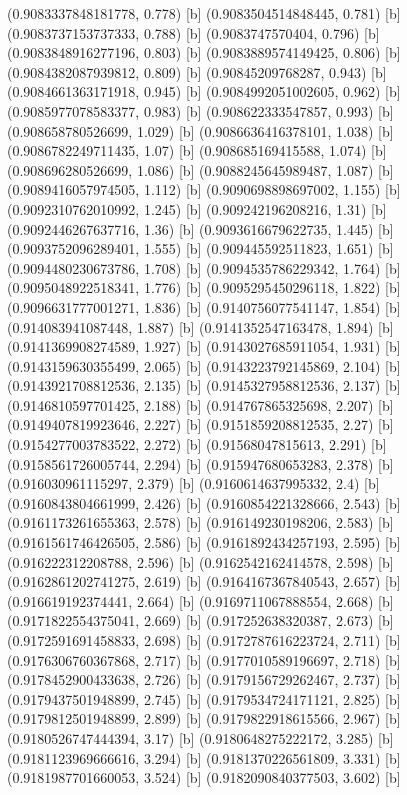 {{{(0.9083337848181778, 0.778) [b] 
(0.9083504514848445, 0.781) [b] 
(0.9083737153737333, 0.788) [b] 
(0.9083747570404, 0.796) [b] 
(0.9083848916277196, 0.803) [b] 
(0.9083889574149425, 0.806) [b] 
(0.9084382087939812, 0.809) [b] 
(0.90845209768287, 0.943) [b] 
(0.9084661363171918, 0.945) [b] 
(0.9084992051002605, 0.962) [b] 
(0.9085977078583377, 0.983) [b] 
(0.908622333547857, 0.993) [b] 
(0.908658780526699, 1.029) [b] 
(0.9086636416378101, 1.038) [b] 
(0.9086782249711435, 1.07) [b] 
(0.908685169415588, 1.074) [b] 
(0.908696280526699, 1.086) [b] 
(0.9088245645989487, 1.087) [b] 
(0.9089416057974505, 1.112) [b] 
(0.9090698898697002, 1.155) [b] 
(0.9092310762010992, 1.245) [b] 
(0.909242196208216, 1.31) [b] 
(0.9092446267637716, 1.36) [b] 
(0.9093616679622735, 1.445) [b] 
(0.9093752096289401, 1.555) [b] 
(0.909445592511823, 1.651) [b] 
(0.9094480230673786, 1.708) [b] 
(0.9094535786229342, 1.764) [b] 
(0.9095048922518341, 1.776) [b] 
(0.9095295450296118, 1.822) [b] 
(0.9096631777001271, 1.836) [b] 
(0.9140756077541147, 1.854) [b] 
(0.914083941087448, 1.887) [b] 
(0.9141352547163478, 1.894) [b] 
(0.9141369908274589, 1.927) [b] 
(0.9143027685911054, 1.931) [b] 
(0.9143159630355499, 2.065) [b] 
(0.9143223792145869, 2.104) [b] 
(0.9143921708812536, 2.135) [b] 
(0.9145327958812536, 2.137) [b] 
(0.9146810597701425, 2.188) [b] 
(0.914767865325698, 2.207) [b] 
(0.9149407819923646, 2.227) [b] 
(0.9151859208812535, 2.27) [b] 
(0.9154277003783522, 2.272) [b] 
(0.91568047815613, 2.291) [b] 
(0.9158561726005744, 2.294) [b] 
(0.915947680653283, 2.378) [b] 
(0.916030961115297, 2.379) [b] 
(0.9160614637995332, 2.4) [b] 
(0.9160843804661999, 2.426) [b] 
(0.9160854221328666, 2.543) [b] 
(0.9161173261655363, 2.578) [b] 
(0.916149230198206, 2.583) [b] 
(0.9161561746426505, 2.586) [b] 
(0.9161892434257193, 2.595) [b] 
(0.916222312208788, 2.596) [b] 
(0.9162542162414578, 2.598) [b] 
(0.9162861202741275, 2.619) [b] 
(0.9164167367840543, 2.657) [b] 
(0.916619192374441, 2.664) [b] 
(0.9169711067888554, 2.668) [b] 
(0.9171822554375041, 2.669) [b] 
(0.917252638320387, 2.673) [b] 
(0.9172591691458833, 2.698) [b] 
(0.9172787616223724, 2.711) [b] 
(0.9176306760367868, 2.717) [b] 
(0.9177010589196697, 2.718) [b] 
(0.9178452900433638, 2.726) [b] 
(0.9179156729262467, 2.737) [b] 
(0.9179437501948899, 2.745) [b] 
(0.9179534724171121, 2.825) [b] 
(0.9179812501948899, 2.899) [b] 
(0.9179822918615566, 2.967) [b] 
(0.9180526747444394, 3.17) [b] 
(0.9180648275222172, 3.285) [b] 
(0.9181123969666616, 3.294) [b] 
(0.9181370226561809, 3.331) [b] 
(0.9181987701660053, 3.524) [b] 
(0.9182090840377503, 3.602) [b] 
}}}
